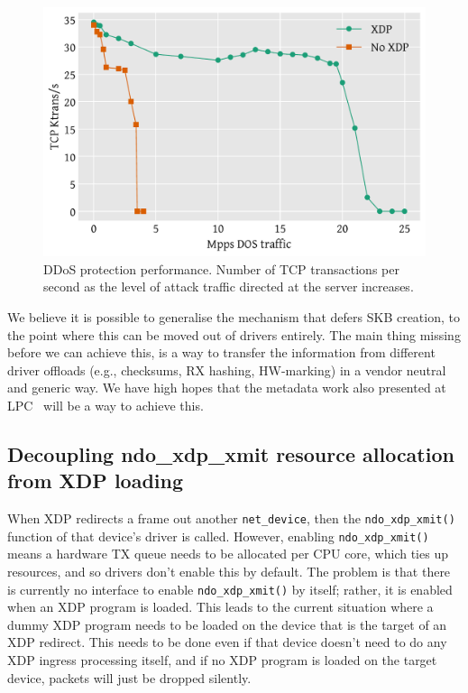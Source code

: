 \documentclass[sigconf]{acmart}
\begin{document}
\begin{figure}[t]
\centering
\includegraphics[width=\linewidth]{images/ddos-test.pdf}
\caption{\label{fig:ddos-results} DDoS protection performance. Number of TCP
  transactions per second as the level of attack traffic directed at the server
  increases.}
\end{figure}

We believe it is possible to generalise the mechanism that defers SKB creation,
to the point where this can be moved out of drivers entirely. The main thing
missing before we can achieve this, is a way to transfer the information from
different driver offloads (e.g., checksums, RX hashing, HW-marking) in a vendor
neutral and generic way. We have high hopes that the metadata work also
presented at LPC~\cite{xdp-metadata} will be a way to achieve this.


\subsection{Decoupling ndo\_xdp\_xmit resource allocation from XDP loading}
\label{sec:decoupling-ndo-xdp-xmit}

When XDP redirects a frame out another \texttt{net\_device}, then the
\texttt{ndo\_xdp\_xmit()} function of that device's driver is called. However,
enabling \texttt{ndo\_xdp\_xmit()} means a hardware TX queue needs to be
allocated per CPU core, which ties up resources, and so drivers don't enable
this by default. The problem is that there is currently no interface to enable
\texttt{ndo\_xdp\_xmit()} by itself; rather, it is enabled when an XDP program
is loaded. This leads to the current situation where a dummy XDP program needs
to be loaded on the device that is the target of an XDP redirect. This needs to
be done even if that device doesn't need to do any XDP ingress processing
itself, and if no XDP program is loaded on the target device, packets will just
be dropped silently.
\end{document}
